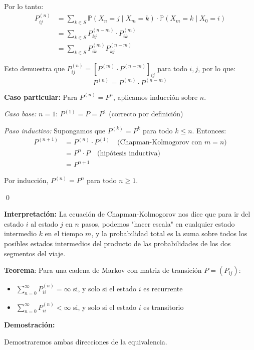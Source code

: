 \documentclass[12pt,a4paper]{article}
\newcommand{\teorema}[1]{%
\begin{teoremabox}
\textbf{Teorema}: #1
\end{teoremabox}
}
\begin{document}
Por lo tanto:
\begin{align*}
P_{ij}^{(n)} &= \sum_{k \in S} \mathbb{P}(X_n = j \mid X_m = k) \cdot \mathbb{P}(X_m = k \mid X_0 = i) \\
&= \sum_{k \in S} P_{kj}^{(n-m)} \cdot P_{ik}^{(m)} \\
&= \sum_{k \in S} P_{ik}^{(m)} P_{kj}^{(n-m)}
\end{align*}

Esto demuestra que $P_{ij}^{(n)} = [P^{(m)} \cdot P^{(n-m)}]_{ij}$ para todo $i,j$, por lo que:
\begin{equation*}
P^{(n)} = P^{(m)} \cdot P^{(n-m)}
\end{equation*}

\textbf{Caso particular:} Para $P^{(n)} = P^n$, aplicamos inducción sobre $n$.

\textit{Caso base:} $n = 1$: $P^{(1)} = P = P^1$ (correcto por definición)

\textit{Paso inductivo:} Supongamos que $P^{(k)} = P^k$ para todo $k \leq n$. Entonces:
\begin{align*}
P^{(n+1)} &= P^{(n)} \cdot P^{(1)} \quad \text{(Chapman-Kolmogorov con } m = n\text{)} \\
&= P^n \cdot P \quad \text{(hipótesis inductiva)} \\
&= P^{n+1}
\end{align*}

Por inducción, $P^{(n)} = P^n$ para todo $n \geq 1$.

\qed

\textbf{Interpretación:} La ecuación de Chapman-Kolmogorov nos dice que para ir del estado $i$ al estado $j$ en $n$ pasos, podemos "hacer escala" en cualquier estado intermedio $k$ en el tiempo $m$, y la probabilidad total es la suma sobre todos los posibles estados intermedios del producto de las probabilidades de los dos segmentos del viaje.


\teorema{Para una cadena de Markov con matriz de transición $P = (P_{ij})$:
\begin{itemize}
    \item $\sum_{n=0}^{\infty} P_{ii}^{(n)} = \infty$ si, y solo si el estado $i$ es recurrente
    \item $\sum_{n=0}^{\infty} P_{ii}^{(n)} < \infty$ si, y solo si el estado $i$ es transitorio
\end{itemize}}

\textbf{Demostración:}

Demostraremos ambas direcciones de la equivalencia.
\end{document}
